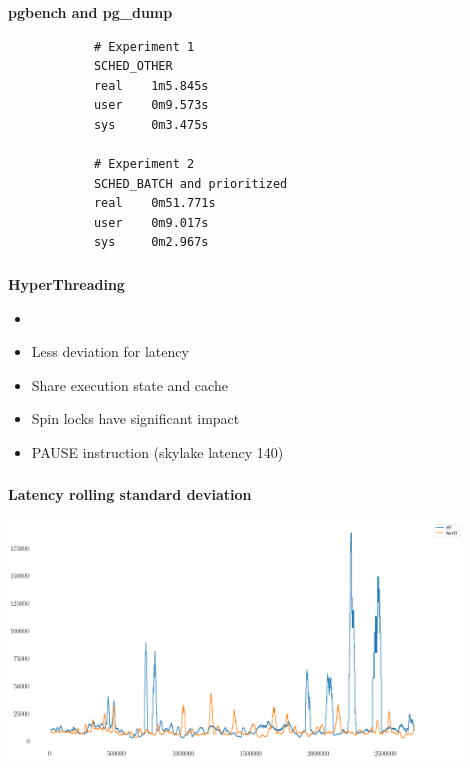 \documentclass[usenames,dvipsnames, 18pt, compress, aspectratio=169]{beamer}
\begin{document}
\begin{frame}[fragile]{}
    \frametitle{}
    \begin{center}
    \textbf{pgbench and pg\_dump}

        \begin{verbatim}
            # Experiment 1
            SCHED_OTHER
            real    1m5.845s
            user    0m9.573s
            sys     0m3.475s

            # Experiment 2
            SCHED_BATCH and prioritized
            real    0m51.771s
            user    0m9.017s
            sys     0m2.967s
        \end{verbatim}

    \end{center}
\end{frame}

\begin{frame}
    \frametitle{}
    \begin{center}
    \textbf{HyperThreading}

        \begin{itemize}
            \item <+->
        \end{itemize}

        \begin{itemize}[label={\MVRightarrow}]
            \item <+-> Less deviation for latency
            \item <+-> Share execution state and cache
            \item <+-> Spin locks have significant impact
            \item <+-> PAUSE instruction (skylake latency 140)
        \end{itemize}

    \end{center}
\end{frame}

\begin{frame}
    \frametitle{}
    \begin{center}
    \textbf{Latency rolling standard deviation}

        \includegraphics[width=0.9\textwidth,center]{hyperthreading.png}

    \end{center}
\end{frame}
\end{document}
